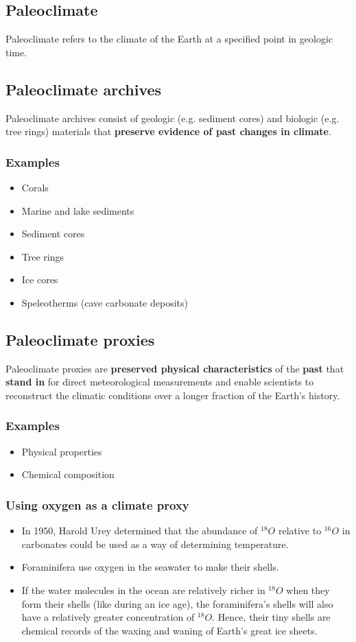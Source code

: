 \documentclass[11pt]{article}
\begin{document}
\subsection{Paleoclimate}
\label{sec:org578eb6f}
Paleoclimate refers to the climate of the Earth at a specified point in geologic time.
\subsection{Paleoclimate archives}
\label{sec:org9a4b3ef}
Paleoclimate archives consist of geologic (e.g. sediment cores) and biologic (e.g. tree rings) materials that \textbf{preserve evidence of past changes in climate}.
\subsubsection{Examples}
\label{sec:org42ce644}
\begin{itemize}
\item Corals
\item Marine and lake sediments
\item Sediment cores
\item Tree rings
\item Ice cores
\item Speleotherms (cave carbonate deposits)
\end{itemize}
\subsection{Paleoclimate proxies}
\label{sec:orgac58263}
Paleoclimate proxies are \textbf{preserved physical characteristics} of the \textbf{past} that \textbf{stand in} for direct meteorological measurements and enable scientists to reconstruct the climatic conditions over a longer fraction of the Earth's history.
\subsubsection{Examples}
\label{sec:org1633c6e}
\begin{itemize}
\item Physical properties
\item Chemical composition
\end{itemize}
\subsubsection{Using oxygen as a climate proxy}
\label{sec:org14d273b}
\begin{itemize}
\item In 1950, Harold Urey determined that the abundance of \(^{18}O\) relative to \(^{16}O\) in carbonates could be used as a way of determining temperature.
\item Foraminifera use oxygen in the seawater to make their shells.
\item If the water molecules in the ocean are relatively richer in \(^{18}O\) when they form their shells (like during an ice age), the foraminifera's shells will also have a relatively greater concentration of \(^{18}O\). Hence, their tiny shells are chemical records of the waxing and waning of Earth's great ice sheets.
\end{itemize}
\end{document}
